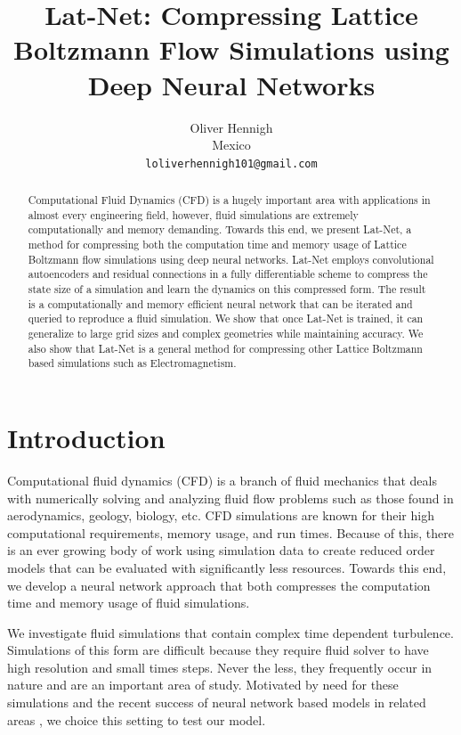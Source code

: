 \documentclass{article}
\title{Lat-Net: Compressing Lattice Boltzmann Flow Simulations using Deep Neural Networks}
\author{
  Oliver Hennigh \\
  Mexico \\
  \texttt{loliverhennigh101@gmail.com} \\
}
\begin{document}

\maketitle

\begin{abstract}
Computational Fluid Dynamics (CFD) is a hugely important area with applications in almost every engineering field, however, fluid simulations are extremely computationally and memory demanding. Towards this end, we present Lat-Net, a method for compressing both the computation time and memory usage of Lattice Boltzmann flow simulations using deep neural networks. Lat-Net employs convolutional autoencoders and residual connections in a fully differentiable scheme to compress the state size of a simulation and learn the dynamics on this compressed form. The result is a computationally and memory efficient neural network that can be iterated and queried to reproduce a fluid simulation. We show that once Lat-Net is trained, it can generalize to large grid sizes and complex geometries while maintaining accuracy. We also show that Lat-Net is a general method for compressing other Lattice Boltzmann based simulations such as Electromagnetism.

\end{abstract}

\section{Introduction}

Computational fluid dynamics (CFD) is a branch of fluid mechanics that deals with numerically solving and analyzing fluid flow problems such as those found in aerodynamics, geology, biology, etc. CFD simulations are known for their high computational requirements, memory usage, and run times. Because of this, there is an ever growing body of work using simulation data to create reduced order models that can be evaluated with significantly less resources. Towards this end, we develop a neural network approach that both compresses the computation time and memory usage of fluid simulations.

We investigate fluid simulations that contain complex time dependent turbulence. Simulations of this form are difficult because they require fluid solver to have high resolution and small times steps. Never the less, they frequently occur in nature and are an important area of study. Motivated by need for these simulations and the recent success of neural network based models in related areas \cite{tompson2016accelerating} \cite{guo2016convolutional} \cite{yang2016data}, we choice this setting to test our model.
\end{document}
